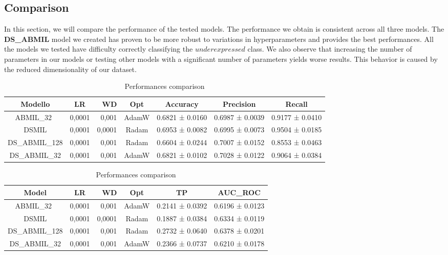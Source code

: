 \documentclass{article}
\begin{document}
\subsection{Comparison}

In this section, we will compare the performance of the tested models. The performance we obtain is consistent across all three models. The \textbf{DS\_ABMIL} model we created has proven to be more robust to variations in hyperparameters and provides the best performances. All the models we tested have difficulty correctly classifying the $underexpressed$ class. We also observe that increasing the number of parameters in our models or testing other models with a significant number of parameters yields worse results. This behavior is caused by the reduced dimensionality of our dataset.


\begin{table}[h]
	\centering
	\begin{tabular}{|ccrc|c|c|c|}
		\hline
		Modello & LR & WD & Opt & Accuracy & Precision & Recall \\
		\hline
		ABMIL\_32\ & 0,0001 & 0,001 & AdamW & 0.6821 ± 0.0160 & 0.6987 ± 0.0039 & 0.9177 ± 0.0410 \\
		DSMIL & 0,0001 & 0,0001 & Radam & 0.6953 ± 0.0082 & 0.6995 ± 0.0073 & 0.9504 ± 0.0185 \\
		DS\_ABMIL\_128 & 0,0001 & 0,001 & Radam & 0.6604 ± 0.0244 & 0.7007 ± 0.0152 & 0.8553 ± 0.0463 \\
		DS\_ABMIL\_32 & 0,0001 & 0,001 & AdamW & 0.6821 ± 0.0102 & 0.7028 ± 0.0122 & 0.9064 ± 0.0384 \\
		\hline
	\end{tabular}
	\begin{tabular}{|ccrc|c|c|}
		\hline
		Model & LR & WD & Opt & TP & AUC\_ROC \\
		\hline
		ABMIL\_32\ & 0,0001 & 0,001 & AdamW & 0.2141 ± 0.0392&0.6196 ± 0.0123\\
		DSMIL & 0,0001 & 0,0001 & Radam & 0.1887 ± 0.0384 & 0.6334 ± 0.0119 \\
		DS\_ABMIL\_128 & 0,0001 & 0,001 & Radam & 0.2732 ± 0.0640 & 0.6378 ± 0.0201 \\
		DS\_ABMIL\_32 & 0,0001 & 0,001 & AdamW & 0.2366 ± 0.0737 & 0.6210 ± 0.0178 \\
		\hline
	\end{tabular}
	
	\caption{Performances comparison}
\end{table}
\end{document}
